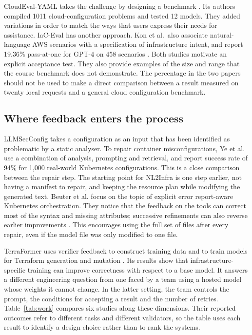 \documentclass[12pt,onecolumn,draftclsnofoot]{IEEEtran}
\begin{document}
CloudEval-YAML takes the challenge by designing a benchmark \cite{cloud}. Its authors compiled 1011 cloud-configuration problems and tested 12 models. They added variations in order to match the ways that users express their needs for assistance. IaC-Eval has another approach. Kon et al.\ also associate natural-language AWS scenarios with a specification of infrastructure intent, and report 19.36\% pass-at-one for GPT-4 on 458 scenarios \cite{iac}. Both studies motivate an explicit acceptance test. They also provide examples of the size and range that the course benchmark does not demonstrate. The percentage in the two papers should not be used to make a direct comparison between a result measured on twenty local requests and a general cloud configuration benchmark.

\subsection{Where feedback enters the process}
LLMSecConfig takes a configuration as an input that has been identified as problematic by a static analyser. To repair container misconfigurations, Ye et al. \cite{sec} use a combination of analysis, prompting and retrieval, and report success rate of 94\% for 1,000 real-world Kubernetes configurations. This is a close comparison between the repair step. The starting point for NL2Infra is one step earlier, not having a manifest to repair, and keeping the resource plan while modifying the generated text. Beuter et al. focus on the topic of explicit error report-aware Kubernetes orchestration. They notice that the feedback on the tools can correct most of the syntax and missing attributes; successive refinements can also reverse earlier improvements \cite{beuter}. This encourages using the full set of files after every repair, even if the model file was only modified to one file.

TerraFormer uses verifier feedback to construct training data and to train models for Terraform generation and mutation \cite{terra}. Its results show that infrastructure-specific training can improve correctness with respect to a base model. It answers a different engineering question from one faced by a team using a hosted model whose weights it cannot change. In the latter setting, the team controls the prompt, the conditions for accepting a result and the number of retries. Table~\ref{tab:work} compares six studies along these dimensions. Their reported outcomes refer to different tasks and different validators, so the table uses each result to identify a design choice rather than to rank the systems.
\end{document}

